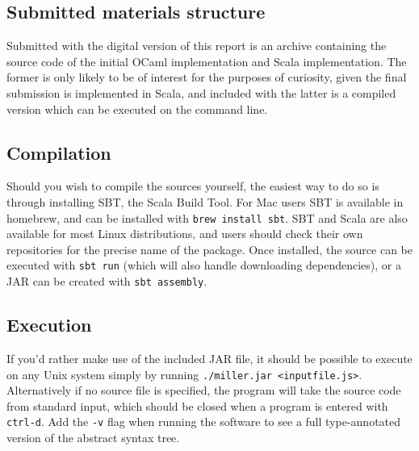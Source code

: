 \documentclass[british, twoside]{bhamthesis}
\theoremstyle{definition}
\begin{document}
\begin{appendices}
\chapter{Submitted materials structure}
Submitted with the digital version of this report is an archive containing the source code of the initial OCaml implementation and Scala implementation. The former is only likely to be of interest for the purposes of curiosity, given the final submission is implemented in Scala, and included with the latter is a compiled version which can be executed on the command line.

\section{Compilation}
Should you wish to compile the sources yourself, the easiest way to do so is through installing SBT, the Scala Build Tool. For Mac users SBT is available in homebrew, and can be installed with \texttt{brew install sbt}. SBT and Scala are also available for most Linux distributions, and users should check their own repositories for the precise name of the package. Once installed, the source can be executed with \texttt{sbt run} (which will also handle downloading dependencies), or a JAR can be created with \texttt{sbt assembly}.

\section{Execution}
If you'd rather make use of the included JAR file, it should be possible to execute on any Unix system simply by running \texttt{./miller.jar <inputfile.js>}. Alternatively if no source file is specified, the program will take the source code from standard input, which should be closed when a program is entered with \texttt{ctrl-d}. Add the \texttt{-v} flag when running the software to see a full type-annotated version of the abstract syntax tree.
\end{appendices}
\end{document}

